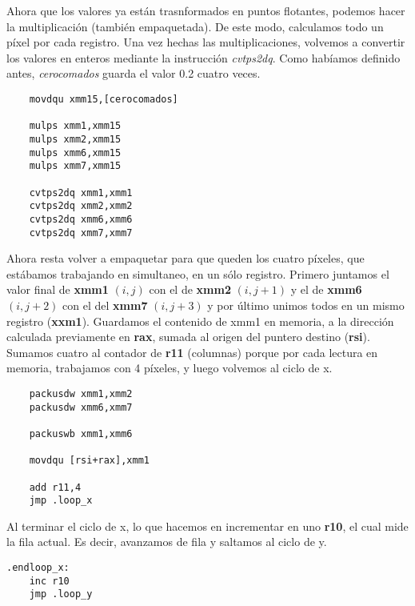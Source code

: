 \documentclass[a4paper]{article}
\begin{document}
\indent Ahora que los valores ya est\'an trasnformados en puntos flotantes, podemos hacer la multiplicaci\'on (tambi\'en empaquetada). De este modo, calculamos todo un p\'ixel por cada registro. Una vez hechas las multiplicaciones, volvemos a convertir los valores en enteros mediante la instrucci\'on \textit{cvtps2dq}. Como hab\'iamos definido antes, \textit{cerocomados} guarda el valor 0.2 cuatro veces.

 \begin{codesnippet}
\begin{verbatim}
    movdqu xmm15,[cerocomados] 

    mulps xmm1,xmm15
    mulps xmm2,xmm15
    mulps xmm6,xmm15
    mulps xmm7,xmm15

    cvtps2dq xmm1,xmm1
    cvtps2dq xmm2,xmm2
    cvtps2dq xmm6,xmm6
    cvtps2dq xmm7,xmm7
\end{verbatim}
\end{codesnippet}
\newpage

\indent Ahora resta volver a empaquetar para que queden los cuatro p\'ixeles, que est\'abamos trabajando en simultaneo, en un s\'olo registro. Primero juntamos el valor final de \textbf{xmm1} $(i,j)$ con el de \textbf{xmm2} $(i,j+1)$ y el de \textbf{xmm6} $(i,j+2)$ con el del \textbf{xmm7} $(i,j+3)$ y por \'ultimo unimos todos en un mismo registro (\textbf{xxm1}). Guardamos el contenido de xmm1 en memoria, a la direcci\'on calculada previamente en \textbf{rax}, sumada al origen del puntero destino (\textbf{rsi}). Sumamos cuatro al contador de \textbf{r11} (columnas) porque por cada lectura en memoria, trabajamos con 4 p\'ixeles, y  luego volvemos al ciclo de x.
 \begin{codesnippet}
\begin{verbatim}
    packusdw xmm1,xmm2
    packusdw xmm6,xmm7

    packuswb xmm1,xmm6

    movdqu [rsi+rax],xmm1   

    add r11,4
    jmp .loop_x
\end{verbatim}
\end{codesnippet}

\indent Al terminar el ciclo de x, lo que hacemos en incrementar en uno \textbf{r10}, el cual mide la fila actual. Es decir, avanzamos de fila y saltamos al ciclo de y.
\begin{codesnippet}
\begin{verbatim}
.endloop_x:
    inc r10
    jmp .loop_y
\end{verbatim}
\end{codesnippet}
\end{document}
